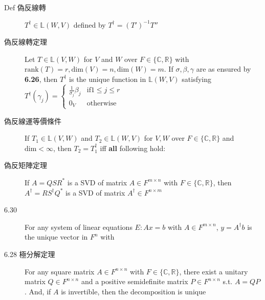 \documentclass[9pt, twocolumn]{extarticle}
\newcommand{\vsdim}{\ensuremath{\text{dim}}}
\newcommand{\rank}{\ensuremath{\text{rank}}}
\newcommand{\realnum}{\mathbb{R}}
\newcommand{\complexnum}{\mathbb{C}}
\newcommand{\ltrans}{\mathbb{L}}
\begin{document}
\begin{description}
        
    \item[Def 偽反線轉] $T^\dagger \in \ltrans(W, V)$ defined by $T^\dagger = (T')^{-1}T''$
    \item[偽反線轉定理] Let $T \in \ltrans(V,W)$ for $V$ and $W$ over $F \in \{\complexnum, \realnum\}$ with $\rank(T)=r, \vsdim(V)=n,\vsdim(W)=m$. If $\sigma, \beta, \gamma$ are as ensured by \textbf{6.26}, then $T^\dagger$ is the unique function in $\ltrans(W, V)$ satisfying $T^\dagger(\gamma_j)=\left\{\begin{array}{cl} \frac{1}{\sigma_j}\beta_j & \text{if} 1 \leq j \leq r\\ 0_V & \text{otherwise}\end{array}\right.$
    \item[偽反線運等價條件] If $T_1 \in \ltrans(V, W)$ and $T_2 \in \ltrans(W, V)$ for $V, W$ over $F \in \{\complexnum, \realnum\}$ and $\vsdim < \infty$, then $T_2 = T_1^\dagger$ iff \textbf{all} following hold:
    \item[偽反矩陣定理] If $A = QSR^*$ is a SVD of matrix $A \in F^{m\times n}$ with $F \in \{\complexnum, \realnum\}$, then $A^\dagger = RS^\dagger Q^*$ is a SVD of matrix $A^\dagger \in F^{n\times m}$
    \item[6.30] For any system of linear equations $E: Ax = b$ with $A \in F^{m\times n}$, $y = A^\dagger b$ is the unique vector in $F^n$ with 
    \item[6.28 極分解定理] For any square matrix $A \in F^{n\times n}$ with $F \in \{\complexnum, \realnum\}$, there exist a unitary matrix $Q \in F^{n\times n}$ and a positive semidefinite matrix $P \in F^{n\times n}$ s.t. $A = QP$. And, if $A$ is invertible, then the decomposition is unique

\end{description}
\end{document}
